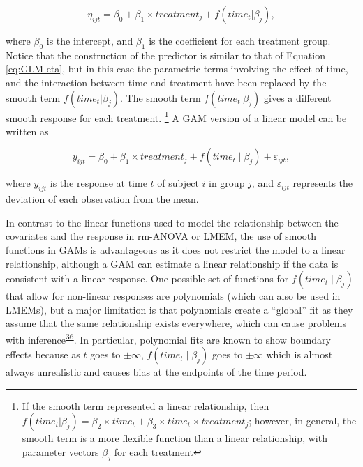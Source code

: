 \documentclass[
]{article}
\begin{document}
\begin{equation}
\eta_{ijt}=\beta_{0}+ \beta_{1} \times treatment_{j} +f(time_{t}|\beta_{j}),
\label{eq:GAM-eta}
\end{equation}

where \(\beta_{0}\) is the intercept, and \(\beta_{1}\) is the coefficient for each treatment group. Notice that the construction of the predictor is similar to that of Equation \eqref{eq:GLM-eta}, but in this case the parametric terms involving the effect of time, and the interaction between time and treatment have been replaced by the smooth term \(f(time_{t}|\beta_{j})\). The smooth term \(f(time_{t}|\beta_{j})\) gives a different smooth response for each treatment. \footnote{If the smooth term represented a linear relationship, then \(f(time_{t}|\beta_{j})= \beta_2 \times time_t+\beta_3 \times time_t \times treatment_j\); however, in general, the smooth term is a more flexible function than a linear relationship, with parameter vectors \(\beta_{j}\) for each treatment} A GAM version of a linear model can be written as

\begin{equation}
  y_{ijt}=\beta_0+ \beta_1 \times treatment_j + f(time_t\mid \beta_j)+\varepsilon_{ijt},
  \label{eq:GAM}
\end{equation}

where \(y_{ijt}\) is the response at time \(t\) of subject \(i\) in group \(j\), and \(\varepsilon_{ijt}\) represents the deviation of each observation from the mean.

In contrast to the linear functions used to model the relationship between the covariates and the response in rm-ANOVA or LMEM, the use of smooth functions in GAMs is advantageous as it does not restrict the model to a linear relationship, although a GAM can estimate a linear relationship if the data is consistent with a linear response. One possible set of functions for \(f(time_t\mid \beta_j)\) that allow for non-linear responses are polynomials (which can also be used in LMEMs), but a major limitation is that polynomials create a ``global'' fit as they assume that the same relationship exists everywhere, which can cause problems with inference\textsuperscript{\protect\hyperlink{ref-beck1998}{36}}. In particular, polynomial fits are known to show boundary effects because as \(t\) goes to \(\pm \infty\), \(f(time_t \mid \beta_j)\) goes to \(\pm \infty\) which is almost always unrealistic and causes bias at the endpoints of the time period.
\end{document}
